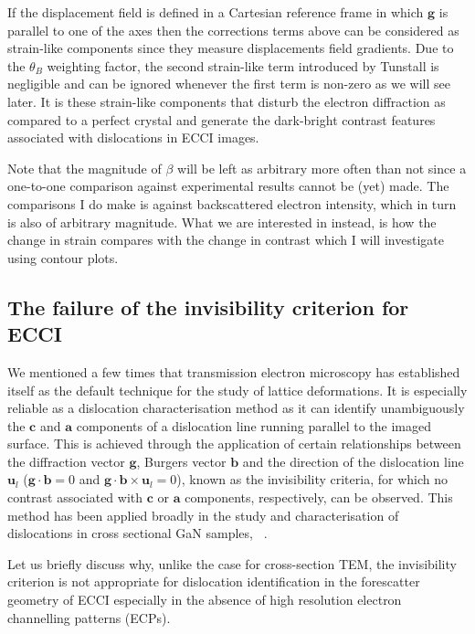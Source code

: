  If the displacement field is defined in a Cartesian reference frame in which $\mathbf{g}$ is parallel to one of the axes then the corrections terms above can be considered as strain-like components since they measure displacements field gradients. Due to the $\theta_B$ weighting factor, the second strain-like term introduced by Tunstall is negligible and can be ignored whenever the first term is non-zero as we will see later. It is these strain-like components that disturb the electron diffraction as compared to a perfect crystal and generate the dark-bright contrast features associated with dislocations in ECCI images.


Note that the magnitude of $\beta$ will be left as arbitrary more often than not since a one-to-one comparison against experimental results cannot be (yet) made. The comparisons I do make is against backscattered electron intensity, which in turn is also of arbitrary magnitude. What we are interested in instead, is how the change in strain compares with the change in contrast which I will investigate using contour plots. 

 
\subsection{The failure of the invisibility criterion for ECCI}

We mentioned a few times that transmission electron microscopy has established itself as the default technique for the study of lattice deformations. It is especially reliable as a dislocation characterisation method as it can identify unambiguously the $\mathbf{c}$ and $\mathbf{a}$ components of a dislocation line running parallel to the imaged surface. This is achieved through the application of certain relationships between the diffraction vector $\mathbf{g}$, Burgers vector $\mathbf{b}$ and the direction of the dislocation line $\mathbf{u}_l$ ($\mathbf{g} \cdot \mathbf{b} = 0$ and $\mathbf{g} \cdot \mathbf{b} \times \mathbf{u}_l = 0$), known as the invisibility criteria, for which no contrast associated with $\mathbf{c}$ or $\mathbf{a}$ components, respectively, can be observed. This method has been applied broadly in the study and characterisation of dislocations in cross sectional GaN samples, \eg ~\cite{Hino00}.


Let us briefly discuss why, unlike the case for cross-section TEM, the invisibility criterion is not appropriate for dislocation identification in the forescatter geometry of ECCI especially in the absence of high resolution electron channelling patterns (ECPs).

